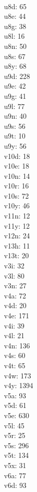 \begin{multicols}{8}
  \\ u8d: 65
  \\ u8e: 44
  \\ u8g: 38
  \\ u8l: 16
  \\ u8n: 50
  \\ u8s: 67
  \\ u8y: 68
  \\ u9d: 228
  \\ u9e: 42
  \\ u9g: 41
  \\ u9l: 77
  \\ u9n: 40
  \\ u9s: 56
  \\ u9t: 10
  \\ u9y: 56
  \\ v10d: 18
  \\ v10e: 18
  \\ v10n: 14
  \\ v10r: 16
  \\ v10s: 72
  \\ v10y: 46
  \\ v11n: 12
  \\ v11y: 12
  \\ v12n: 24
  \\ v13h: 11
  \\ v13t: 20
  \\ v3i: 32
  \\ v3l: 80
  \\ v3n: 27
  \\ v4a: 72
  \\ v4d: 20
  \\ v4e: 171
  \\ v4i: 39
  \\ v4l: 21
  \\ v4n: 136
  \\ v4s: 60
  \\ v4t: 65
  \\ v4w: 173
  \\ v4y: 1394
  \\ v5a: 93
  \\ v5d: 61
  \\ v5e: 630
  \\ v5l: 45
  \\ v5r: 25
  \\ v5s: 296
  \\ v5t: 134
  \\ v5x: 31
  \\ v6a: 77
  \\ v6d: 93

\end{multicols}
